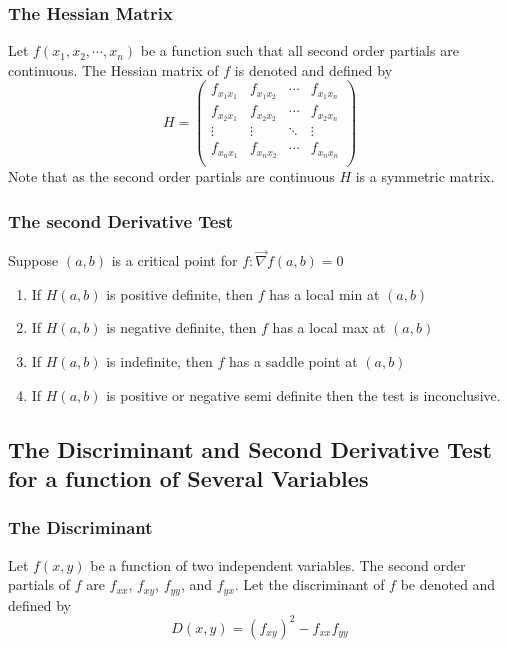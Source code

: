 \documentclass[14pt]{article}
\begin{document}
    \subsubsection{The Hessian Matrix}
    Let $f(x_1, x_2, \cdots, x_n)$ be a function such that all second order partials are continuous. The Hessian matrix of $f$ is denoted and defined by
    $$H=\begin{pmatrix}
        f_{x_1x_1} & f_{x_1x_2}& \cdots &f_{x_1x_n}\\
        f_{x_2x_1}& f_{x_2x_2}&\cdots&f_{x_2x_n}\\
        \vdots&\vdots&\ddots&\vdots\\
        f_{x_nx_1}&f_{x_nx_2}&\cdots&f_{x_nx_n}\\
    \end{pmatrix}$$
    Note that as the second order partials are continuous $H$ is a symmetric matrix.
    \subsubsection{The second Derivative Test}
    Suppose $(a,b)$ is a critical point for $f:\vec\nabla f(a,b)=0$
    \begin{enumerate}
        \item If $H(a,b)$ is positive definite, then $f$ has a local min at $(a,b)$
        \item If $H(a,b)$ is negative definite, then $f$ has a local max at $(a,b)$
        \item If $H(a,b)$ is indefinite, then $f$ has a saddle point at $(a,b)$
        \item If $H(a,b)$ is positive or negative semi definite then the test is inconclusive.
    \end{enumerate}
    
    \subsection{The Discriminant and Second Derivative Test for a function of Several Variables}
    \subsubsection{The Discriminant}
    Let $f(x,y)$ be a function of two independent variables. The second order partials of $f$ are $f_{xx}$, $f_{xy}$, $f_{yy}$, and $f_{yx}$. Let the discriminant of $f$ be denoted and defined by
    $$D(x,y)=(f_{xy})^2-f_{xx}f_{yy}$$
\end{document}
